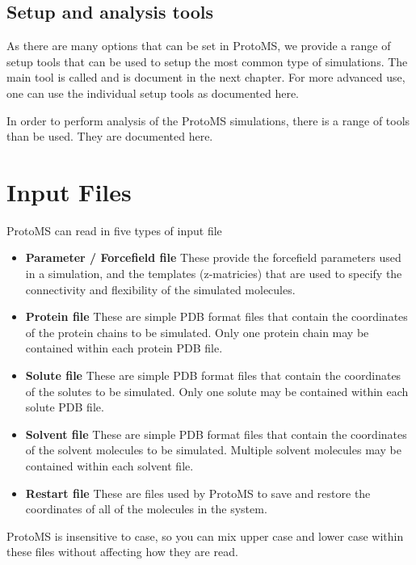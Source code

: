 \documentclass[letterpaper,10pt,english]{sphinxmanual}
\begin{document}
\section{Setup and analysis tools}
\label{protoms:setup-and-analysis-tools}
As there are many options that can be set in ProtoMS, we provide a range of setup tools that can be used to setup the most common type of simulations. The main tool is called  and is document in the next chapter. For more advanced use, one can use the individual setup tools as documented here.

In order to perform analysis of the ProtoMS simulations, there is a range of tools than be used. They are documented here.


\chapter{Input Files}
\label{protoms:input-files}
ProtoMS can read in five types of input file
\begin{itemize}
\item {} 
\textbf{Parameter / Forcefield file} These provide the forcefield parameters used in a simulation, and the templates (z-matricies) that are used to specify the connectivity and flexibility of the simulated molecules.

\item {} 
\textbf{Protein file} These are simple PDB format files that contain the coordinates of the protein chains to be simulated. Only one protein chain may be contained within each protein PDB file.

\item {} 
\textbf{Solute file} These are simple PDB format files that contain the coordinates of the solutes to be simulated. Only one solute may be contained within each solute PDB file.

\item {} 
\textbf{Solvent file} These are simple PDB format files that contain the coordinates of the solvent molecules to be simulated. Multiple solvent molecules may be contained within each solvent file.

\item {} 
\textbf{Restart file} These are files used by ProtoMS to save and restore the coordinates of all of the molecules in the system.

\end{itemize}

ProtoMS is insensitive to case, so you can mix upper case and lower case within these files without affecting how
they are read.
\end{document}
